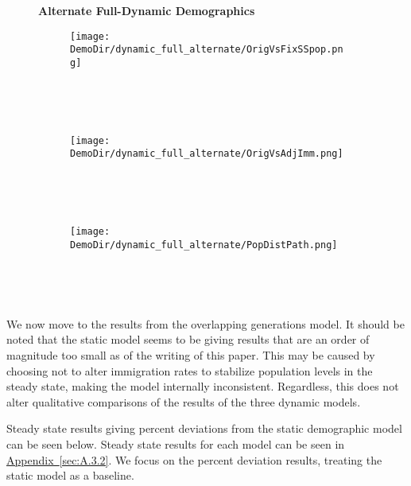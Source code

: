 \documentclass[10pt]{article}
\renewcommand{\thesection}{\arabic{section}}
\renewcommand{\thesubsection}{\thesection.\arabic{subsection}}
\newcommand{\aref}[1]{\hyperref[#1]{Appendix~\ref{#1}}}
\renewcommand{\section}[2][]{\oldsection[#1]{#2}\index{#1}\label{sec:\thesection}}
\renewcommand{\subsection}[2][]{\oldsubsection[#1]{#2}\index{#1}\label{sec:\thesubsection}}
\numberwithin{equation}{subsection}
\newcommand*{\DemoDir}{../../code/Rick/OUTPUT/Demographics}
\begin{document}
\begin{figure}[!ht]
   \textbf{Alternate Full-Dynamic Demographics}
   \begin{subfigure}{0.33\textwidth}
      \centering
      \texttt{[image: \\DemoDir/dynamic\_full\_alternate/OrigVsFixSSpop.png]}
      \caption{\\ }
   \end{subfigure}%
   ~ %
   \begin{subfigure}{0.33\textwidth}
      \centering
      \texttt{[image: \\DemoDir/dynamic\_full\_alternate/OrigVsAdjImm.png]}
      \caption{\\ }
   \end{subfigure}%
   ~ %
   \begin{subfigure}{0.33\textwidth}
      \centering
      \texttt{[image: \\DemoDir/dynamic\_full\_alternate/PopDistPath.png]}
      \caption{\\ }
   \end{subfigure}
\end{figure}

\par We now move to the results from the overlapping generations model. It should be noted that the static model seems to be giving results that are an order of magnitude too small as of the writing of this paper. This may be caused by choosing not to alter immigration rates to stabilize population levels in the steady state, making the model internally inconsistent. Regardless, this does not alter qualitative comparisons of the results of the three dynamic models.

\subsection{Steady State}

\par Steady state results giving percent deviations from the static demographic model can be seen below. Steady state results for each model can be seen in \aref{sec:A.3.2}. We focus on the percent deviation results, treating the static model as a baseline.
\end{document}
